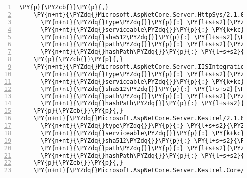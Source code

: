 \begin{Verbatim}[commandchars=\\\{\},numbers=left,firstnumber=1,stepnumber=1,numberblanklines=0]
    \PY{p}{\PYZcb{}}\PY{p}{,}
    \PY{n+nt}{\PYZdq{}Microsoft.AspNetCore.Server.HttpSys/2.1.0\PYZhy{}rc1\PYZhy{}final\PYZdq{}}\PY{p}{:} \PY{p}{\PYZob{}}
      \PY{n+nt}{\PYZdq{}type\PYZdq{}}\PY{p}{:} \PY{l+s+s2}{\PYZdq{}package\PYZdq{}}\PY{p}{,}
      \PY{n+nt}{\PYZdq{}serviceable\PYZdq{}}\PY{p}{:} \PY{k+kc}{true}\PY{p}{,}
      \PY{n+nt}{\PYZdq{}sha512\PYZdq{}}\PY{p}{:} \PY{l+s+s2}{\PYZdq{}sha512\PYZhy{}OPmUZAoMn6gJDTr7f+bKdik3UFXvTlamxP/dygAPXb70Awv1mYCZgF3jkZC7eUCAz3VbPU1praldqEHHP9nsvQ==\PYZdq{}}\PY{p}{,}
      \PY{n+nt}{\PYZdq{}path\PYZdq{}}\PY{p}{:} \PY{l+s+s2}{\PYZdq{}microsoft.aspnetcore.server.httpsys/2.1.0\PYZhy{}rc1\PYZhy{}final\PYZdq{}}\PY{p}{,}
      \PY{n+nt}{\PYZdq{}hashPath\PYZdq{}}\PY{p}{:} \PY{l+s+s2}{\PYZdq{}microsoft.aspnetcore.server.httpsys.2.1.0\PYZhy{}rc1\PYZhy{}final.nupkg.sha512\PYZdq{}}
    \PY{p}{\PYZcb{}}\PY{p}{,}
    \PY{n+nt}{\PYZdq{}Microsoft.AspNetCore.Server.IISIntegration/2.1.0\PYZhy{}rc1\PYZhy{}final\PYZdq{}}\PY{p}{:} \PY{p}{\PYZob{}}
      \PY{n+nt}{\PYZdq{}type\PYZdq{}}\PY{p}{:} \PY{l+s+s2}{\PYZdq{}package\PYZdq{}}\PY{p}{,}
      \PY{n+nt}{\PYZdq{}serviceable\PYZdq{}}\PY{p}{:} \PY{k+kc}{true}\PY{p}{,}
      \PY{n+nt}{\PYZdq{}sha512\PYZdq{}}\PY{p}{:} \PY{l+s+s2}{\PYZdq{}sha512\PYZhy{}kAtoM1HhFRzFHtaHCGxsDVEbwLxPl9UfwkuybxBYPg1kiWeqmfXa+W/N9FU4zRJ+VIfQ7g++zX9zgyiwd1F4JA==\PYZdq{}}\PY{p}{,}
      \PY{n+nt}{\PYZdq{}path\PYZdq{}}\PY{p}{:} \PY{l+s+s2}{\PYZdq{}microsoft.aspnetcore.server.iisintegration/2.1.0\PYZhy{}rc1\PYZhy{}final\PYZdq{}}\PY{p}{,}
      \PY{n+nt}{\PYZdq{}hashPath\PYZdq{}}\PY{p}{:} \PY{l+s+s2}{\PYZdq{}microsoft.aspnetcore.server.iisintegration.2.1.0\PYZhy{}rc1\PYZhy{}final.nupkg.sha512\PYZdq{}}
    \PY{p}{\PYZcb{}}\PY{p}{,}
    \PY{n+nt}{\PYZdq{}Microsoft.AspNetCore.Server.Kestrel/2.1.0\PYZhy{}rc1\PYZhy{}final\PYZdq{}}\PY{p}{:} \PY{p}{\PYZob{}}
      \PY{n+nt}{\PYZdq{}type\PYZdq{}}\PY{p}{:} \PY{l+s+s2}{\PYZdq{}package\PYZdq{}}\PY{p}{,}
      \PY{n+nt}{\PYZdq{}serviceable\PYZdq{}}\PY{p}{:} \PY{k+kc}{true}\PY{p}{,}
      \PY{n+nt}{\PYZdq{}sha512\PYZdq{}}\PY{p}{:} \PY{l+s+s2}{\PYZdq{}sha512\PYZhy{}EwsdKLorsWAwv8NBpGwz7GdPWY+oyGxwBJaO21EnvlT58ywOOWKoXVJbJ0LTs57/LSfeokLqKIk3845weW3Cvg==\PYZdq{}}\PY{p}{,}
      \PY{n+nt}{\PYZdq{}path\PYZdq{}}\PY{p}{:} \PY{l+s+s2}{\PYZdq{}microsoft.aspnetcore.server.kestrel/2.1.0\PYZhy{}rc1\PYZhy{}final\PYZdq{}}\PY{p}{,}
      \PY{n+nt}{\PYZdq{}hashPath\PYZdq{}}\PY{p}{:} \PY{l+s+s2}{\PYZdq{}microsoft.aspnetcore.server.kestrel.2.1.0\PYZhy{}rc1\PYZhy{}final.nupkg.sha512\PYZdq{}}
    \PY{p}{\PYZcb{}}\PY{p}{,}
    \PY{n+nt}{\PYZdq{}Microsoft.AspNetCore.Server.Kestrel.Core/2.1.0\PYZhy{}rc1\PYZhy{}final\PYZdq{}}\PY{p}{:} \PY{p}{\PYZob{}}

\end{Verbatim}

